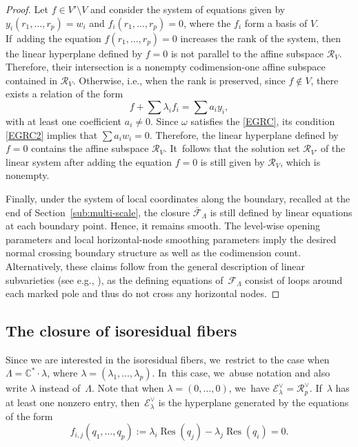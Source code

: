 \documentclass[11pt]{article}
\newcommand{\ie}{i.e.,\xspace}
\newcommand\calR{{\mathcal R}}
\DeclareMathOperator\Res{Res}
\theoremstyle{definition}
\begin{document}
\begin{proof}
Let $f\!\in\! V'\setminus V$ and consider the system of equations given by \hbox{$y_{i}(r_1,\ldots, r_p)=w_{i}$} and $f_{i}(r_1,\ldots, r_p)=0$, where the $f_{i}$ form a basis of $V$. If~adding the equation $f(r_1,\ldots, r_p)=0$ increases the rank of the system, then the linear hyperplane defined by $f = 0$ is not parallel to the affine subspace $\calR_V$. Therefore, their intersection is a nonempty codimension-one affine subspace contained in $\calR_{V}$. Otherwise, \ie when the rank is preserved, since $f\notin V$, there exists a relation of the form
\[
f+\sum \lambda_{i}f_{i} = \sum a_{i}y_{i},
\]
with at least one coefficient $a_{i}\neq 0$.
Since $\omega$ satisfies the \ref{EGRC}, its condition \eqref{EGRC2} implies that
$\sum a_{i} w_{i}=0$. Therefore, the linear hyperplane defined by $f = 0$ contains the affine subspace $\calR_V$. It~follows that
the solution set $\calR_{V'}$ of the linear system after adding the equation $f = 0$ is still given by $\calR_{V}$, which is nonempty.

Finally, under the system of local coordinates along the boundary, recalled at the end of Section~\ref{sub:multi-scale}, the closure $\overline{\mathcal{F}}_{\Lambda}$ is still defined by linear equations at each boundary point. Hence, it remains smooth. The level-wise opening parameters and local horizontal-node smoothing parameters imply the desired normal crossing boundary structure as well as the codimension count. Alternatively, these claims follow from the general description of linear subvarieties (see e.g., \cite[Cor.\,1.8]{BDG}), as the defining equations of~$\mathcal F_\Lambda$ consist of loops around each marked pole and thus do not cross any horizontal nodes.
\end{proof}

\subsection{The closure of isoresidual fibers}\label{sub:isoclosure}

Since we are interested in the isoresidual fibers, we~restrict to the case when $\Lambda = \mathbb{C}^{\ast} \cdot \lambda$, where $\lambda = (\lambda_1,\ldots, \lambda_p)$. In~this case, we~abuse notation and also write $\lambda$ instead of~$\Lambda$.
Note that when $\lambda=(0,\dots,0)$, we~have $\mathcal{E}_{\lambda}^{\vee}=\mathcal{R}_{p}^{\vee}$. If~$\lambda$ has at least one nonzero entry, then~$\mathcal{E}_{\lambda}^{\vee}$ is the hyperplane generated by the equations of the form
\begin{equation}\label{eq:relres}
f_{i,j}(q_{1},\dots,q_{p}):=\lambda_{i}\Res(q_{j})-\lambda_{j}\Res(q_{i})=0.
\end{equation}
\end{document}
